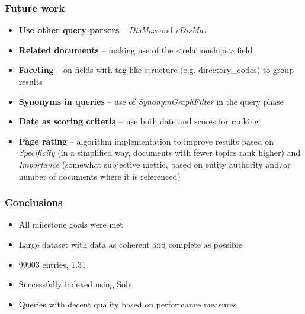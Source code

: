 \documentclass[table]{beamer}
\def\texttt#1{<#1>}
\begin{document}
\begin{frame}
\frametitle{Future work}

    \begin{itemize}
        \item \textbf{Use other query parsers} -- \textit{DisMax} and \textit{eDisMax}
        \item \textbf{Related documents} -- making use of the \texttt{relationships} field
        \item \textbf{Faceting} -- on fields with tag-like structure (e.g. directory\_codes) to group results
        \item \textbf{Synonyms in queries} -- use of \textit{SynonymGraphFilter} in the query phase
        \item \textbf{Date as scoring criteria} -- use both date and scores for ranking
        \item \textbf{Page rating} -- algorithm implementation to improve results based on \textit{Specificity} (in a simplified way, documents with fewer topics rank higher) and \textit{Importance} (somewhat subjective metric, based on entity authority and/or number of documents where it is referenced)
    \end{itemize}
\end{frame}

\begin{frame}
\frametitle{Conclusions}

\begin{itemize}
    \item All milestone goals were met
    \item Large dataset with data as coherent and complete as possible
    \item \SI{99903}{} entries, \SI{1.31}{\giga\byte}
    \item Successfully indexed using Solr
    \item Queries with decent quality based on performance measures
\end{itemize}

\end{frame}
\end{document}
